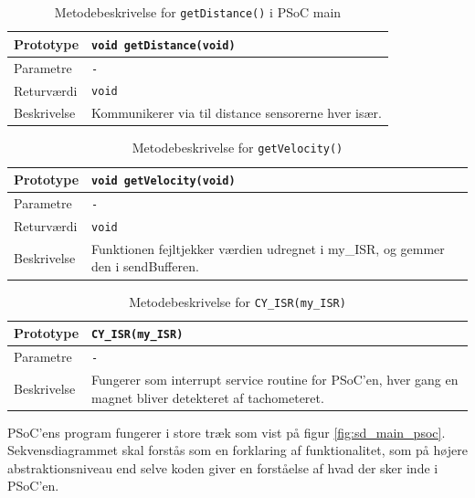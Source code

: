 \begin{table}[h]
	\begin{tabularx}{\textwidth}{| L{2.5 cm} | Z |} \hline
	Prototype 	& \texttt{void getDistance(void)} \\\hline
	Parametre 	& \texttt{-} \\\hline
	Returværdi	& \texttt{void} 			\newline \\\hline
	Beskrivelse	& Kommunikerer via \IIC til distance sensorerne hver især.  \\\hline
	\end{tabularx}
	\caption{Metodebeskrivelse for \texttt{getDistance()} i PSoC main}
	\label{table:psoc_getdistance}
\end{table}

\clearpage

\begin{table}[h]
	\begin{tabularx}{\textwidth}{| L{2.5 cm} | Z |} \hline
	Prototype 	& \texttt{void getVelocity(void)} \\\hline
	Parametre 	& \texttt{-}		\\\hline
	Returværdi	& \texttt{void} 			\newline \\\hline
	Beskrivelse	& Funktionen fejltjekker værdien udregnet i my\_ISR, og gemmer den i sendBufferen. \newline \\\hline
	\end{tabularx}
	\caption{Metodebeskrivelse for \texttt{getVelocity()}}
	\label{table:psoc_getvelocity}
\end{table}

\begin{table}[h]
	\begin{tabularx}{\textwidth}{| L{2.5 cm} | Z |} \hline
	Prototype 	& \texttt{CY\_ISR(my\_ISR)} 	\\\hline
	Parametre 	& \texttt{-}				\\\hline
	Beskrivelse	& Fungerer som interrupt service routine for PSoC'en, hver gang en magnet bliver detekteret af tachometeret.\newline \\\hline
	\end{tabularx}
	\caption{Metodebeskrivelse for \texttt{CY\_ISR(my\_ISR)}}
	\label{table:psoc_my_isr}
\end{table}

PSoC'ens program fungerer i store træk som vist på figur \ref{fig:sd_main_psoc}. Sekvensdiagrammet skal forstås som en forklaring af funktionalitet, som på højere abstraktionsniveau end selve koden giver en forståelse af hvad der sker inde i PSoC'en. 

